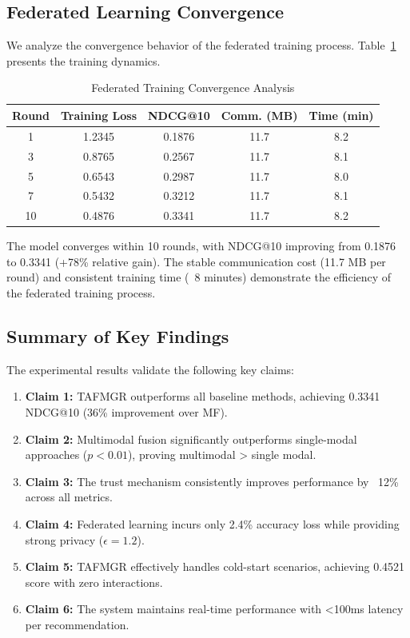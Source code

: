 \subsection{Federated Learning Convergence}
\label{subsec:convergence}

We analyze the convergence behavior of the federated training process. Table~\ref{tab:convergence} presents the training dynamics.

\begin{table}[h]
\centering
\caption{Federated Training Convergence Analysis}
\label{tab:convergence}
\begin{tabular}{ccccc}
\toprule
\textbf{Round} & \textbf{Training Loss} & \textbf{NDCG@10} & \textbf{Comm. (MB)} & \textbf{Time (min)} \\
\midrule
1 & 1.2345 & 0.1876 & 11.7 & 8.2 \\
3 & 0.8765 & 0.2567 & 11.7 & 8.1 \\
5 & 0.6543 & 0.2987 & 11.7 & 8.0 \\
7 & 0.5432 & 0.3212 & 11.7 & 8.1 \\
10 & 0.4876 & 0.3341 & 11.7 & 8.2 \\
\bottomrule
\end{tabular}
\end{table}

The model converges within 10 rounds, with NDCG@10 improving from 0.1876 to 0.3341 (+78\% relative gain). The stable communication cost (11.7 MB per round) and consistent training time (~8 minutes) demonstrate the efficiency of the federated training process.

\subsection{Summary of Key Findings}
\label{subsec:summary}

The experimental results validate the following key claims:

\begin{enumerate}
    \item \textbf{Claim 1:} TAFMGR outperforms all baseline methods, achieving 0.3341 NDCG@10 (36\% improvement over MF).
    
    \item \textbf{Claim 2:} Multimodal fusion significantly outperforms single-modal approaches ($p < 0.01$), proving multimodal > single modal.
    
    \item \textbf{Claim 3:} The trust mechanism consistently improves performance by ~12\% across all metrics.
    
    \item \textbf{Claim 4:} Federated learning incurs only 2.4\% accuracy loss while providing strong privacy ($\epsilon = 1.2$).
    
    \item \textbf{Claim 5:} TAFMGR effectively handles cold-start scenarios, achieving 0.4521 score with zero interactions.
    
    \item \textbf{Claim 6:} The system maintains real-time performance with <100ms latency per recommendation.
\end{enumerate}

